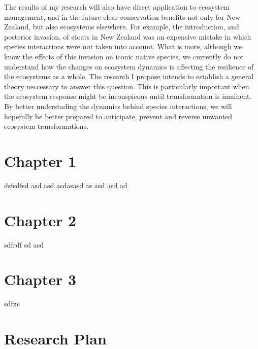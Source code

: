 \documentclass[a4paper]{report}
\begin{document}
The results of my research will also have direct application to ecosystem management, and in the future clear conservation benefits not only for New Zealand, but also ecosystems elsewhere. 
For example, the introduction, and posterior invasion, of stoats in New Zealand was an expensive mistake in which species interactions were not taken into account. 
What is more, although we know the effects of this invasion on iconic native species, we currently do not understand how the changes on ecosystem dynamics is affecting the resilience of the ecosystems as a whole.
The research I propose intends to establish a general theory neccessary to answer this question. 
This is particularly important when the ecosystem response might be inconspicous until transformation is inminent.
By better understading the dynamics behind species interactions, we will hopefully be better prepared to anticipate, prevent and reverse unwanted ecosystem transformations.

\chapter*{Chapter 1}

dsfsdfsd asd asd asdasasd as asd asd ad

\chapter*{Chapter 2}

sdfrdf sd
asd
\chapter*{Chapter 3}

sdfxc 

\chapter*{Research Plan}


\end{document}
